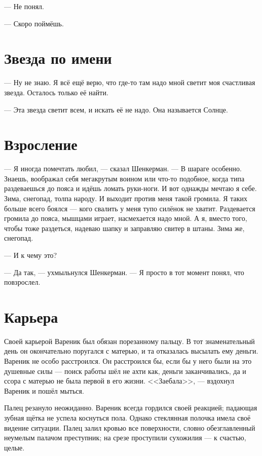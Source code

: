 \documentclass[a4paper,10pt,fleqn]{book}\usepackage{polyglossia}\setdefaultlanguage{english}\setotherlanguage{russian}\defaultfontfeatures{Ligatures=TeX,Mapping=tex-text} \usepackage{xcolor}\definecolor{lightgray}{HTML}{bbbbbb}\color{lightgray}\newcommand{\ml}[3]{\textcolor{black}{#3}}
\begin{document}
--- Не понял.

--- Скоро поймёшь.

\section{Звезда по имени}

--- Ну не знаю.
Я всё ещё верю, что где-то там надо мной светит моя счастливая звезда.
Осталось только её найти.

--- Эта звезда светит всем, и искать её не надо.
Она называется Солнце.

\section{Взросление}

--- Я иногда помечтать любил, --- сказал Шенкерман.
--- В шараге особенно.
Знаешь, воображал себя мегакрутым воином или что-то подобное, когда типа раздеваешься до пояса и идёшь ломать руки-ноги.
И вот однажды мечтаю я себе.
Зима, снегопад, толпа народу.
И выходит против меня такой громила.
Я таких больше всего боялся --- кого свалить у меня тупо силёнок не хватит.
Раздевается громила до пояса, мышцами играет, насмехается надо мной.
А я, вместо того, чтобы тоже раздеться, надеваю шапку и заправляю свитер в штаны.
Зима же, снегопад.

--- И к чему это?

--- Да так, --- ухмыльнулся Шенкерман.
--- Я просто в тот момент понял, что повзрослел.

\section{Карьера}

Своей карьерой Вареник был обязан порезанному пальцу.
В тот знаменательный день он окончательно поругался с матерью, и та отказалась высылать ему деньги.
Вареник не особо расстроился.
Он расстроился бы, если бы у него были на это душевные силы --- поиск работы шёл не ахти как, деньги заканчивались, да и ссора с матерью не была первой в его жизни.
<<Заебала>>, --- вздохнул Вареник и пошёл мыться.

Палец резануло неожиданно.
Вареник всегда гордился своей реакцией;
падающая зубная щётка не успела коснуться пола.
Однако стеклянная полочка имела своё видение ситуации.
Палец залил кровью все поверхности, словно обезглавленный неумелым палачом преступник;
на срезе проступили сухожилия --- к счастью, целые.
\end{document}
